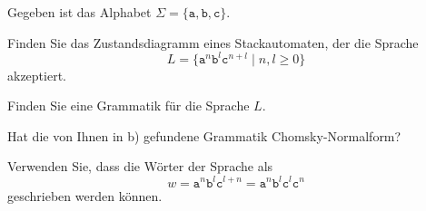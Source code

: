 Gegeben ist das Alphabet $\Sigma=\{\texttt{a},\texttt{b},\texttt{c}\}$.
\begin{teilaufgaben}
\item
Finden Sie das Zustandsdiagramm eines Stackautomaten, der die Sprache
\[
L
=
\{ \texttt{a}^n \texttt{b}^l \texttt{c}^{n+l}\;|\; n,l\ge 0\}
\]
akzeptiert.
\item
Finden Sie eine Grammatik für die Sprache $L$.
\item
Hat die von Ihnen in b) gefundene Grammatik Chomsky-Normalform?
\end{teilaufgaben}

\begin{hinweis}
Verwenden Sie, dass die Wörter der Sprache als
\[
w
=
\texttt{a}^n \texttt{b}^l \texttt{c}^{l+n}
=
\texttt{a}^n \texttt{b}^l \texttt{c}^{l} \texttt{c}^{n}
\]
geschrieben werden können.
\end{hinweis}

